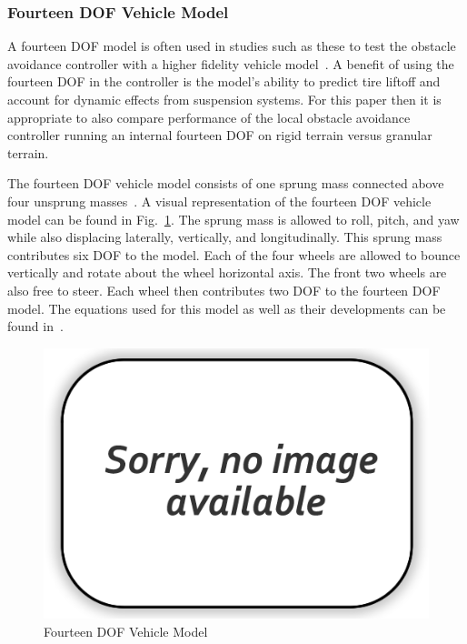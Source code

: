 \documentclass[12pt,twocolumn]{article}
\begin{document}

\subsubsection{Fourteen DOF Vehicle Model}\label{sss:14DOFModel}
A fourteen DOF model is often used in studies such as these to test the obstacle avoidance controller with a higher fidelity vehicle model~\cite{foo, bar}. A benefit of using the fourteen DOF in the controller is the model’s ability to predict tire liftoff and account for dynamic effects from suspension systems. For this paper then it is appropriate to also compare performance of the local obstacle avoidance controller running an internal fourteen DOF on rigid terrain versus granular terrain.  

The fourteen DOF vehicle model consists of one sprung mass connected above four unsprung masses~\cite{foo}. A visual representation of the fourteen DOF vehicle model can be found in Fig.~\ref{fig:14DOF}. The sprung mass is allowed to roll, pitch, and yaw while also displacing laterally, vertically, and longitudinally. This sprung mass contributes six DOF to the model. Each of the four wheels are allowed to bounce vertically and rotate about the wheel horizontal axis. The front two wheels are also free to steer. Each wheel then contributes two DOF to the fourteen DOF model. The equations used for this model as well as their developments can be found in~\cite{foo}.

\begin{figure}
	\centering
	\includegraphics[width=\columnwidth]{Figs/no-image.png}
	\caption{\small Fourteen DOF Vehicle Model}  
	\label{fig:14DOF}
\end{figure}
\end{document}
